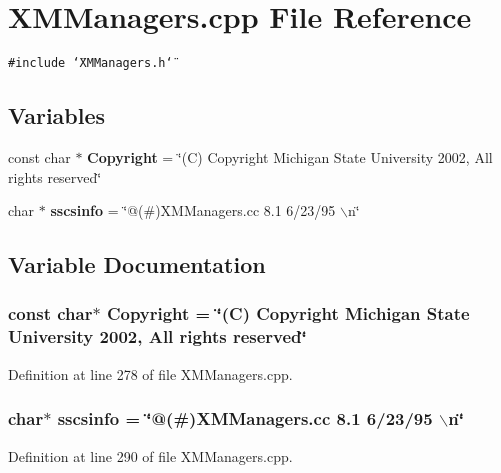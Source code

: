 \section{XMManagers.cpp File Reference}
\label{XMManagers_8cpp}
{\tt \#include \char`\"{}XMManagers.h\char`\"{}}\par
\subsection*{Variables}
\begin{CompactItemize}
\item 
const char $\ast$ {\bf Copyright} = \char`\"{}(C) Copyright Michigan State University 2002, All rights reserved\char`\"{}
\item 
char $\ast$ {\bf sscsinfo} = \char`\"{}@(\#)XMManagers.cc 8.1 6/23/95 $\backslash$n\char`\"{}
\end{CompactItemize}


\subsection{Variable Documentation}
\subsubsection{\setlength{\rightskip}{0pt plus 5cm}const char$\ast$ Copyright = \char`\"{}(C) Copyright Michigan State University 2002, All rights reserved\char`\"{}\hspace{0.3cm}{\tt  [static]}}\label{XMManagers_8cpp_a0}




Definition at line 278 of file XMManagers.cpp.
\subsubsection{\setlength{\rightskip}{0pt plus 5cm}char$\ast$ sscsinfo = \char`\"{}@(\#)XMManagers.cc 8.1 6/23/95 $\backslash$n\char`\"{}\hspace{0.3cm}{\tt  [static]}}\label{XMManagers_8cpp_a1}




Definition at line 290 of file XMManagers.cpp.